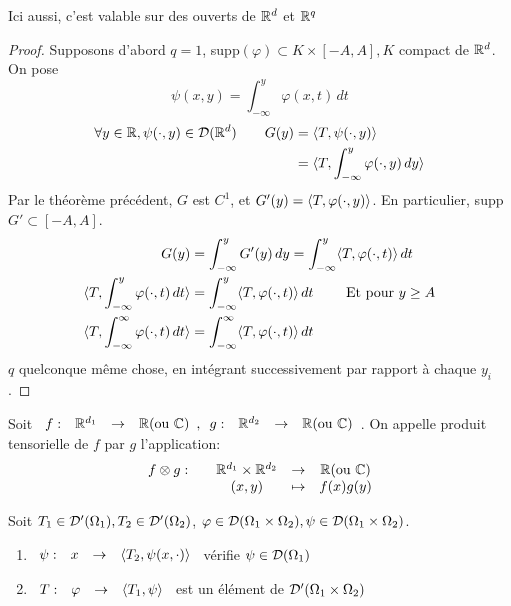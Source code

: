 \documentclass[]{report}
\begin{document}
    \begin{re}{}{}
        Ici aussi, c'est valable sur des ouverts de $\mathbb{R}^d$ et $\mathbb{R}^q$
    \end{re}

    \begin{proof}
        Supposons d'abord $q=1$, supp$(\varphi)\subset K\times \left[-A,A\right],K$ compact de $\mathbb{R}^d$. On pose
        \[\psi(x,y)=\int_{-\infty}^{y}\varphi(x,t)\, dt\]
        \begin{align*}
            \forall y\in \mathbb{R},\psi(\cdot,y)\in \mathcal{D}(\mathbb{R}^d)\qquad G(y)&=\langle T,\psi(\cdot,y) \rangle\\
            &=\langle T,\int_{-\infty}^{y}\varphi(\cdot,y)\, dy  \rangle
        \end{align*}
        Par le théorème précédent, $G$ est $C^1$, et $G'(y)=\langle T,\varphi(\cdot,y) \rangle$. En particulier, supp$G'\subset \left[-A,A\right]$.
        \begin{align*}
            G(y)&=\int_{-\infty}^{y}G'(y)\, dy=\int_{-\infty}^y\langle T,\varphi(\cdot,t) \rangle\, dt\\
            \langle T,\int_{-\infty}^{y}\varphi(\cdot,t)\, dt \rangle&=\int_{-\infty}^{y}\langle T,\varphi(\cdot,t) \rangle\, dt\qquad \text{ Et pour $y\ge A$}\\
            \langle T,\int_{-\infty}^{\infty}\varphi(\cdot,t)\, dt \rangle&= \int_{-\infty}^{\infty}\langle T,\varphi(\cdot,t) \rangle\, dt
        \end{align*}
        $q$ quelconque même chose, en intégrant successivement par rapport à chaque $y_i$.
    \end{proof}

    \begin{df}{}{}
        Soit $\begin{array}{ccccc} f : & \mathbb{R}^{d_1} & \to & \mathbb{R}\text{(ou $\mathbb{C}$)} \end{array},\begin{array}{ccccc} g : & \mathbb{R}^{d_2} & \to & \mathbb{R}\text{(ou $\mathbb{C}$)} \end{array}$. On appelle produit tensorielle de $f$ par $g$ l'application:
        \[\begin{array}{ccccc} f\otimes g : & & \mathbb{R}^{d_1}\times \mathbb{R}^{d_2} & \to & \mathbb{R}\text{(ou $\mathbb{C}$)} \\ & & (x,y) & \mapsto & f(x)g(y) \end{array}\]
    \end{df}

    \begin{prop}{}{}
        Soit $T_1\in \mathcal{D}'(\Omega_1),T_2\in \mathcal{D}'(\Omega_2)$, $\varphi\in \mathcal{D}(\Omega_1\times \Omega_2),\psi\in \mathcal{D}(\Omega_1\times \Omega_2)$.
        \begin{enumerate}
            \item $\begin{array}{ccccc} \psi : & x & \to & \langle T_2,\psi(x,\cdot) \rangle \end{array}$ vérifie $\psi\in \mathcal{D}(\Omega_1)$
            \item $\begin{array}{ccccc} T : & \varphi & \to & \langle T_1,\psi \rangle \end{array}$ est un élément de $\mathcal{D}'(\Omega_1\times \Omega_2)$
        \end{enumerate}
    \end{prop}
\end{document}
